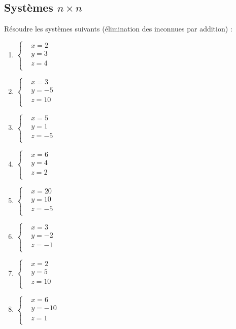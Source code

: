 \subsection{Systèmes $n\times n$}

\begin{solution}

Résoudre les systèmes suivants (élimination des inconnues par addition) :
\begin{multicols}{3}
\begin{enumerate}
\item $\left\{ \begin{array}{ll}
  & x=2 \\ 
 & y=3 \\ 
 & z=4 \\ 
\end{array} \right.$
\item $\left\{ \begin{array}{ll}
  & x=3 \\ 
 & y=-5 \\ 
 & z=10 \\ 
\end{array} \right.$
\item $\left\{ \begin{array}{ll}
  & x=5 \\ 
 & y=1 \\ 
 & z=-5 \\ 
\end{array} \right.$
\item $\left\{ \begin{array}{ll}
  & x=6 \\ 
 & y=4 \\ 
 & z=2 \\ 
\end{array} \right.$
\item $\left\{ \begin{array}{ll}
  & x=20 \\ 
 & y=10 \\ 
 & z=-5 \\ 
\end{array} \right.$
\item $\left\{ \begin{array}{ll}
  & x=3 \\ 
 & y=-2 \\ 
 & z=-1 \\ 
\end{array} \right.$
\item $\left\{ \begin{array}{ll}
  & x=2 \\ 
 & y=5 \\ 
 & z=10 \\ 
\end{array} \right.$
\item $\left\{ \begin{array}{ll}
  & x=6 \\ 
 & y=-10 \\ 
 & z=1 \\ 
\end{array} \right.$
\end{enumerate}
\end{multicols}
\end{solution}

